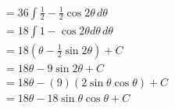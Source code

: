 \documentclass[preview]{standalone}
\begin{document}
\begin{align*}
&=36 \int \frac{1}{2} - \frac{1}{2}\cos2\theta \, d\theta \\ &=18 \int 1-\cos2\theta d\theta \, d\theta \\ &=18(\theta-\frac{1}{2}\sin2\theta) + C \\ &=18\theta-9\sin2\theta +C \\ &=18\theta-(9)(2\sin\theta\cos\theta) + C \\ &=18\theta-18\sin\theta\cos\theta +C
\end{align*}
\end{document}
